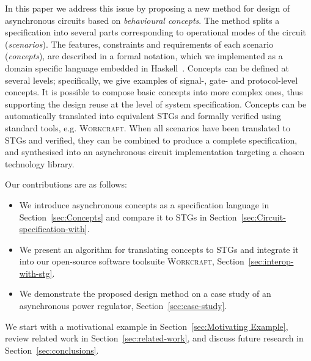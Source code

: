 \documentclass[british, journal]{IEEEtran}
\newcommand{\noun}[1]{\textsc{#1}}
\begin{document}
In this paper we address this issue by proposing a new method for design
of asynchronous circuits based on \emph{behavioural concepts}.
The method splits a specification into several parts corresponding
to operational modes of the circuit (\emph{scenarios}). The features,
constraints and requirements of each scenario (\emph{concepts}),
are described in a formal notation, which we implemented as a domain
specific language embedded in Haskell~\cite{1996_hudak_dsl}. Concepts can
be defined at several levels; specifically, we give examples of signal-,
gate- and protocol-level concepts. It is possible to compose basic concepts
into more complex ones, thus supporting the design reuse at the level of system
specification.
Concepts can be automatically translated into equivalent STGs and
formally verified using standard tools, e.g. \noun{Workcraft}.
When all scenarios have been translated to STGs and verified, they can be
combined to produce a complete specification, and synthesised into an
asynchronous circuit implementation targeting a chosen technology library.

Our contributions are as follows:
\begin{itemize}
  \item We introduce asynchronous concepts as a specification
  language in Section~\ref{sec:Concepts} and compare it to STGs in
  Section~\ref{sec:Circuit-specification-with}.
  \item We present an algorithm for translating concepts to STGs
  and integrate it into our open-source software toolsuite \noun{Workcraft},
  Section~\ref{sec:interop-with-stg}.
  \item We demonstrate the proposed design method on a case study of an
  asynchronous power regulator, Section~\ref{sec:case-study}.
\end{itemize}

\noindent
We start with a motivational example in Section~\ref{sec:Motivating Example},
review related work
in Section~\ref{sec:related-work}, and discuss future research in
Section~\ref{sec:conclusions}.
\end{document}
